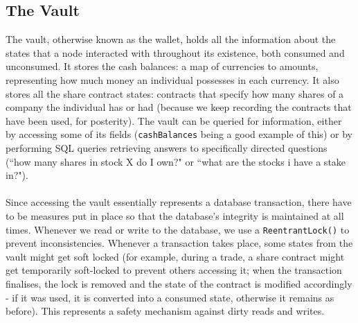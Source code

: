 \documentclass[12pt,twoside]{article}
\begin{document}
\subsection{The Vault}
\label{sub:vault}
The vault, otherwise known as the wallet, holds all the information about the states that a node interacted with throughout its existence, both consumed and unconsumed. It stores the cash balances: a map of currencies to amounts, representing how much money an individual possesses in each currency. It also stores all the share contract states: contracts that specify how many shares of a company the individual has or had (because we keep recording the contracts that have been used, for posterity). The vault can be queried for information, either by accessing some of its fields (\verb|cashBalances| being a good example of this) or by performing SQL queries retrieving answers to specifically directed questions (``how many shares in stock X do I own?" or ``what are the stocks i have a stake in?").
\\ \\
Since accessing the vault essentially represents a database transaction, there have to be measures put in place so that the database's integrity is maintained at all times. Whenever we read or write to the database, we use a \verb|ReentrantLock()| to prevent inconsistencies. Whenever a transaction takes place, some states from the vault might get soft locked (for example, during a trade, a share contract might get temporarily soft-locked to prevent others accessing it; when the transaction finalises, the lock is removed and the state of the contract is modified accordingly - if it was used, it is converted into a consumed state, otherwise it remains as before). This represents a safety mechanism against dirty reads and writes.
\end{document}
